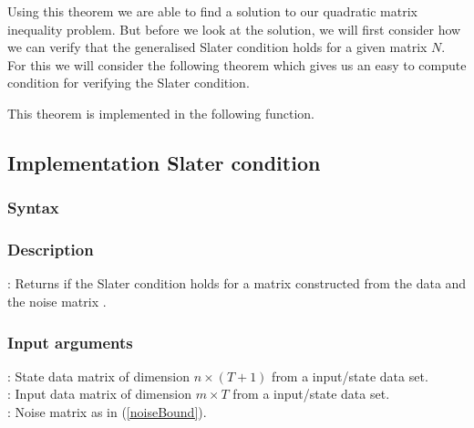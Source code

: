 Using this theorem we are able to find a solution to our quadratic matrix inequality problem. But before we look at the solution, we will first consider how we can verify that the generalised Slater condition holds for a given matrix $N$. For this we will consider the following theorem which gives us an easy to compute condition for verifying the Slater condition.




This theorem is implemented in the following function.

\subsection{Implementation Slater condition}
\subsubsection*{Syntax}

\subsubsection*{Description}
: Returns if the Slater condition holds for a matrix  constructed from the data  and the noise matrix .

\subsubsection*{Input arguments}
\textbf{}: State data matrix of dimension $n \times (T+1)$ from a input/state data set.\\
\textbf{}: Input data matrix of dimension $m \times T$ from a input/state data set.\\
\textbf{}: Noise matrix as in (\ref{noiseBound}).

